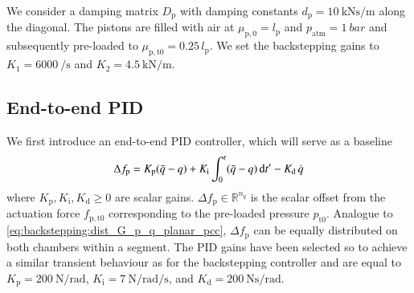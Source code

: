 We consider a damping matrix $D_\mathrm{p}$ with damping constants $d_\mathrm{p} = \SI{10}{\kilo \newton \second \per \meter}$ along the diagonal. The pistons are filled with air at $\mu_{\mathrm{p}, 0} = l_\mathrm{p}$ and $p_\mathrm{atm} = \SI{1}{bar}$ and subsequently pre-loaded to $\mu_{\mathrm{p}, \mathrm{t}0} = 0.25 \, l_\mathrm{p}$. %
We set the backstepping gains to $K_1 = \SI{6000}{\per \second}$ and $K_2 = \SI{4.5}{\kilo \newton \per \meter}$.

\subsection{End-to-end PID}
We first introduce an end-to-end PID controller, which will serve as a baseline
%
\begin{equation}\small
    \Delta f_\mathrm{p} = K_\mathrm{p} (\bar{q}-q) + K_\mathrm{i} \int_0^t (\bar{q}-q) \, \mathrm{d}t' - K_\mathrm{d} \, \dot{q}
\end{equation}
%
where $K_\mathrm{p},K_\mathrm{i},K_\mathrm{d} \geq 0$ are scalar gains. $\Delta f_\mathrm{p} \in \mathbb{R}^{n_q}$ is the scalar offset from the actuation force $f_{\mathrm{p},\mathrm{t}0}$ corresponding to the pre-loaded pressure $p_{\mathrm{t}0}$.
%
Analogue to \eqref{eq:backstepping:dist_G_p_q_planar_pcc}, $\Delta f_\mathrm{p}$ can be equally distributed on both chambers within a segment.
The PID gains have been selected so to achieve a similar transient behaviour as for the backstepping controller %
and are equal to $K_\mathrm{p} = \SI{200}{\newton \per \radian}$, $K_\mathrm{i} = \SI{7}{\newton \per \radian \per \second}$, and $K_\mathrm{d} = \SI{200}{\newton \second \per \radian}$. 

